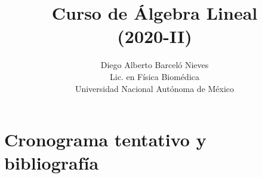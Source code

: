\documentclass[12pt]{article}
\begin{document}
\title{Curso de Álgebra Lineal \\ (2020-II)}
\author{Diego Alberto Barceló Nieves\\
Lic. en Física Biomédica \\ Universidad Nacional Autónoma de México}

\maketitle


\section{Cronograma tentativo y bibliografía}



\end{document}
